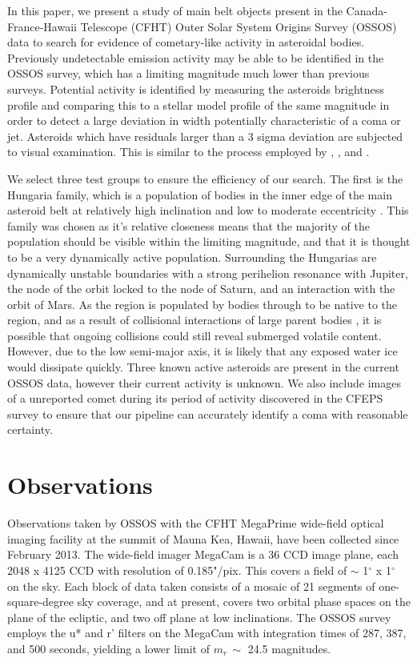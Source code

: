 \documentclass[iop,apj]{emulateapj}
\begin{document}
In this paper, we present a study of main belt objects present in the Canada-France-Hawaii Telescope (CFHT) Outer Solar System Origins Survey (OSSOS) data to search for evidence of cometary-like activity in asteroidal bodies. Previously undetectable emission activity may be able to be identified in the OSSOS survey, which has a limiting magnitude much lower than previous surveys. Potential activity is identified by measuring the asteroids brightness profile and comparing this to a stellar model profile of the same magnitude in order to detect a large deviation in width potentially characteristic of a coma or jet. Asteroids which have residuals larger than a 3 sigma deviation are subjected to visual examination. This is similar to the process employed by \cite{luu92}, \cite{sonnett11}, and \cite{gilbert09}.

We select three test groups to ensure the efficiency of our search. The first is the Hungaria family, which is a population of bodies in the inner edge of the main asteroid belt at relatively high inclination and low to moderate eccentricity \citep{milani10}. This family was chosen as it's relative closeness means that the majority of the population should be visible within the limiting magnitude, and that it is thought to be a very dynamically active population. Surrounding the Hungarias are dynamically unstable boundaries with a strong perihelion resonance with Jupiter, the node of the orbit locked to the node of Saturn, and an interaction with the orbit of Mars. As the region is populated by bodies through to be native to the region, and as a result of collisional interactions of large parent bodies \citep{milani10}, it is possible that ongoing collisions could still reveal submerged volatile content. However, due to the low semi-major axis, it is likely that any exposed water ice would dissipate quickly. 
Three known active asteroids are present in the current OSSOS data, however their current activity is unknown. We also include images of a unreported comet during its period of activity discovered in the CFEPS survey to ensure that our pipeline can accurately identify a coma with reasonable certainty.


\section{Observations}

Observations taken by OSSOS with the CFHT MegaPrime wide-field optical imaging facility at the summit of Mauna Kea, Hawaii, have been collected since February 2013. The wide-field imager MegaCam is a 36 CCD image plane, each 2048 x 4125 CCD with resolution of 0.185"/pix. This covers a field of  $\sim$ 1$^{\circ}$ x 1$^{\circ}$ on the sky. Each block of data taken consists of a mosaic of 21 segments of one-square-degree sky coverage, and at present, covers two orbital phase spaces on the plane of the ecliptic, and two off plane at low inclinations. The OSSOS survey employs the u* and r' filters on the MegaCam with integration times of 287, 387, and 500 seconds, yielding a lower limit of $m_r \, \sim$ 24.5 magnitudes.
\end{document}
